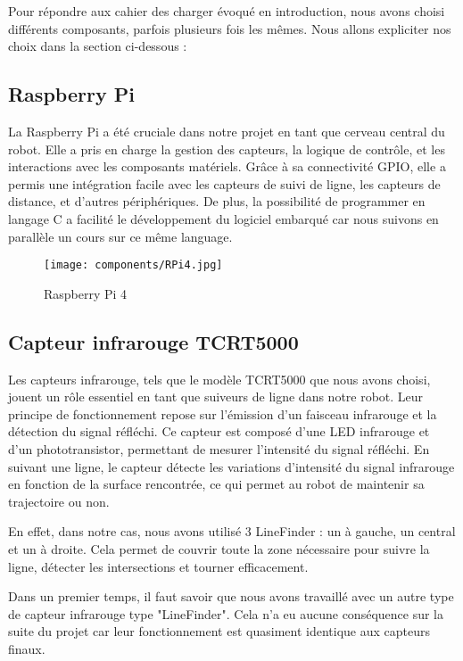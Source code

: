 Pour répondre aux cahier des charger évoqué en introduction, nous avons choisi différents composants, parfois plusieurs fois les mêmes. Nous allons expliciter nos choix dans la section ci-dessous :

\subsection{Raspberry Pi}
La Raspberry Pi a été cruciale dans notre projet en tant que cerveau central du robot. Elle a pris en charge la gestion des capteurs, la logique de contrôle, et les interactions avec les composants matériels. Grâce à sa connectivité GPIO, elle a permis une intégration facile avec les capteurs de suivi de ligne, les capteurs de distance, et d'autres périphériques. De plus, la possibilité de programmer en langage C a facilité le développement du logiciel embarqué car nous suivons en parallèle un cours sur ce même language.

\begin{figure}[h]
    \centering
    \texttt{[image: components/RPi4.jpg]}
    \caption{Raspberry Pi 4}
    \label{fig:Raspberry Pi 4}
\end{figure}

\subsection{Capteur infrarouge TCRT5000}
Les capteurs infrarouge, tels que le modèle TCRT5000 que nous avons choisi, jouent un rôle essentiel en tant que suiveurs de ligne dans notre robot. Leur principe de fonctionnement repose sur l'émission d'un faisceau infrarouge et la détection du signal réfléchi. Ce capteur est composé d'une LED infrarouge et d'un phototransistor, permettant de mesurer l'intensité du signal réfléchi. En suivant une ligne, le capteur détecte les variations d'intensité du signal infrarouge en fonction de la surface rencontrée, ce qui permet au robot de maintenir sa trajectoire ou non.

En effet, dans notre cas, nous avons utilisé 3 LineFinder : un à gauche, un central et un à droite. Cela permet de couvrir toute la zone nécessaire pour suivre la ligne, détecter les intersections et tourner efficacement.

Dans un premier temps, il faut savoir que nous avons travaillé avec un autre type de capteur infrarouge type "LineFinder". Cela n'a eu aucune conséquence sur la suite du projet car leur fonctionnement est quasiment identique aux capteurs finaux.

